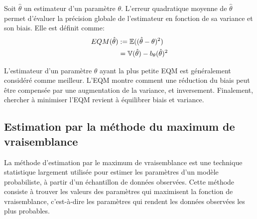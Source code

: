 \begin{definition}
    Soit $\hat{\theta}$ un estimateur d'un paramètre $\theta$. L'erreur quadratique moyenne de $\hat{\theta}$ 
    permet d'évaluer la précision globale de l'estimateur en fonction de sa variance et son biais. 
    Elle est définit comme: 
        \begin{align*}
            EQM(\hat{\theta}) &:= \mathbb{E}((\hat{\theta} - \theta)^2) \\ 
            &= \mathbb{V}(\hat{\theta}) - b_\theta(\hat{\theta})^2
        \end{align*}
\end{definition}

\begin{remark}[Interprétation]
    L'estimateur d'un paramètre $\theta$ ayant la plus petite EQM est généralement considéré comme meilleur.
    L'EQM montre comment une réduction du biais peut être compensée par une augmentation de la variance, et inversement.
    Finalement, chercher à minimiser l'EQM revient à équilibrer biais et variance.
\end{remark}

\subsection{Estimation par la méthode du maximum de vraisemblance}

La méthode d'estimation par le maximum de vraisemblance est une technique statistique largement 
utilisée pour estimer les paramètres d'un modèle probabiliste, à partir d'un échantillon de données observées. 
Cette méthode consiste à trouver les valeurs des paramètres qui maximisent la fonction de vraisemblance, 
c'est-à-dire les paramètres qui rendent les données observées les plus probables.

\newpage 

